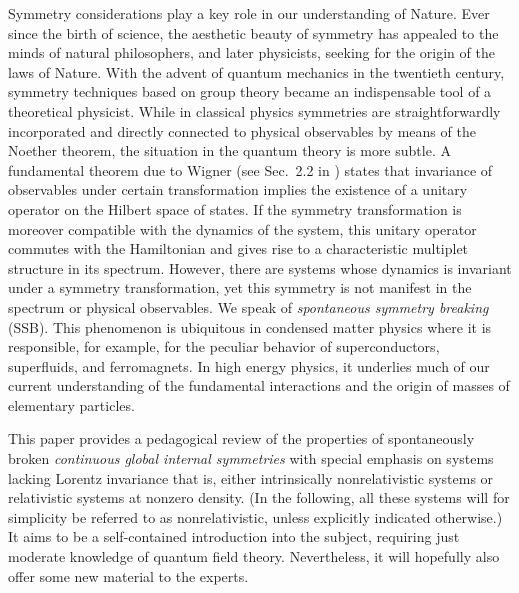 \documentclass[final,2p,times,12pt,sort&compress]{elsarticle}
\begin{document}
Symmetry considerations play a key role in our understanding of Nature. Ever
since the birth of science, the aesthetic beauty of symmetry has appealed to
the minds of natural philosophers, and later physicists, seeking for the origin
of the laws of Nature. With the advent of quantum mechanics in the twentieth
century, symmetry techniques based on group theory became an indispensable tool
of a theoretical physicist. While in classical physics symmetries are
straightforwardly incorporated and directly connected to physical observables
by means of the Noether theorem, the situation in the quantum theory is more
subtle. A fundamental theorem due to Wigner (see Sec.~2.2 in
\cite{Weinberg:1995v1}) states that
invariance of observables under certain transformation implies the existence of
a unitary operator on the Hilbert space of states. If the symmetry
transformation is moreover compatible with the dynamics of the system, this
unitary operator commutes with the Hamiltonian and gives rise to a
characteristic multiplet structure in its spectrum. However, there are systems
whose dynamics is invariant under a symmetry transformation, yet this symmetry
is not manifest in the spectrum or physical observables. We speak of
\emph{spontaneous symmetry breaking} (SSB). This phenomenon is ubiquitous in
condensed matter physics where it is responsible, for example, for the peculiar
behavior of superconductors, superfluids, and ferromagnets. In high energy
physics, it underlies much of our current understanding of the fundamental
interactions and the origin of masses of elementary particles.

This paper provides a pedagogical review of the properties of spontaneously
broken \emph{continuous global internal symmetries} with special emphasis on
systems lacking Lorentz invariance that is, either intrinsically nonrelativistic
systems or relativistic systems at nonzero density. (In the following, all
these systems will for simplicity be referred to as nonrelativistic, unless
explicitly indicated otherwise.) It aims to be a self-contained introduction
into the subject, requiring just moderate knowledge of quantum field theory.
Nevertheless, it will hopefully also offer some new material to the experts.
\end{document}
